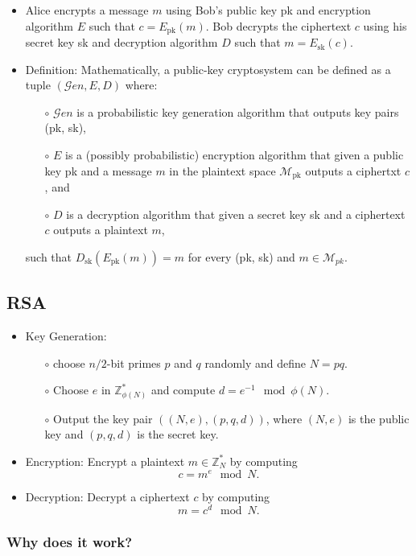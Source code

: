 \documentclass[a4paper]{scrartcl}
\begin{document}
\begin{itemize}
\item Alice encrypts a message $m$ using Bob's public key pk and encryption algorithm $E$ such that $c = E_{\text{pk}}(m)$. Bob decrypts the ciphertext $c$ using his secret key sk and decryption algorithm  $D$ such that $m = E_{\text{sk}}(c)$.
\item Definition: Mathematically, a public-key cryptosystem can be defined as a tuple $({\mathcal Gen}, E, D)$ where:

\begin{itemize}
\item [$\circ$] ${\mathcal Gen}$ is a probabilistic key generation algorithm that outputs key pairs (pk, sk),
\item [$\circ$] $E$ is a (possibly probabilistic) encryption algorithm that given a public key pk and a message $m$ in the plaintext space ${\mathcal M}_{\text{pk}}$ outputs a ciphertxt $c$, and
\item [$\circ$] $D$ is a decryption algorithm that given a secret key sk and a ciphertext $c$ outputs a plaintext $m$, 
\end{itemize}
such that $D_{\text{sk}}(E_{\text{pk}}(m)) = m$ for every (pk, sk) and $m \in \mathcal {M}_{pk}$.
\end{itemize}

\subsection*{RSA}

\begin{itemize}
\item Key Generation:
\begin{itemize}
\item [$\circ$] choose $n/2$-bit primes $p$ and $q$ randomly and define $N = pq$.
\item [$\circ$] Choose $e$ in $\mathbb{Z}_{\phi(N)}^*$ and compute $d = e^{-1}\mod \phi(N)$.
\item [$\circ$] Output the key pair $((N,e), (p,q,d))$, where $(N,e)$ is the public key and $(p,q,d)$ is the secret key.
\end{itemize}
\item Encryption: Encrypt a plaintext $m \in \mathbb{Z}_N^*$ by computing $$c = m^e \mod N.$$
\item Decryption: Decrypt a ciphertext $c$ by computing $$m = c^d \mod N.$$
\end{itemize}

\subsubsection*{Why does it work?}
\end{document}
